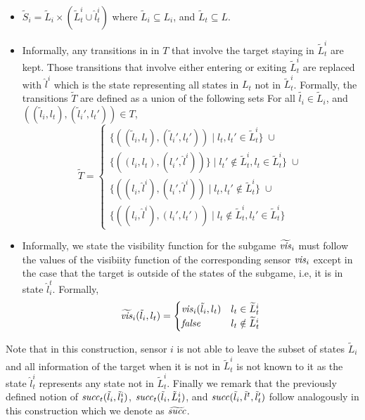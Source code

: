 \begin{itemize}
\item $\widetilde{S}_i= \widetilde{L}_i \times (\widetilde{L}^i_t \cup \hat{l}^i_t)$ where $\widetilde{L}_i\subseteq L_i$, and $\widetilde{L}_t \subseteq L$. 
\item Informally, any transitions in in $T$ that involve the target staying in $\widetilde{L}^i_t$ are kept. Those transitions that involve either entering or exiting $\widetilde{L}^i_t$ are replaced with $\hat{l}^i$ which is the state representing all states in $L_t$ not in $\widetilde{L}^i_t$. Formally, the transitions $\widetilde{T}$ are defined as a union of the following sets  For all $\tilde{l_i} \in \widetilde{L}_i$, and $((\tilde{l}_i,l_t),(\tilde{l}_i',l_t')) \in T$, \[\widetilde{T} = \begin{cases}
 \{((\tilde{l}_i,l_t),(\tilde{l}_i',l_t')) \mid l_t,l_t' \in \widetilde{L}^i_t \} \; \cup \\
 \{((l_i,l_t),(l_i',\hat{l}^i)) \} \mid l_t' \notin \widetilde{L}_t^i, l_t \in \widetilde{L}_t^i \}  \; \cup \\
 \{((l_i,\hat{l}^i),(l_i',\hat{l}^i)) \mid l_t,l_t' \notin \widetilde{L}_t^i \}  \; \cup \\
 \{((l_i,\hat{l}^i),(l_i',l_t')) \mid l_t \notin \widetilde{L}_t^i, l_t' \in \widetilde{L}_t^i \} 
  \end{cases}   \]
  
\item Informally, we state the visibility function for the subgame $\widetilde{\mathit{vis}}_i$ must follow the values of the visibiity function of the corresponding sensor $\mathit{vis}_i$ except in the case that the target is outside of the states of the subgame, i.e, it is in state $\hat{l}^t_i$. Formally,  \[\widetilde{\mathit{vis}}_i(\tilde{l}_i,l_t) = \begin{cases}
\mathit{vis}_i(\tilde{l}_i,l_t) & l_t \in \widetilde{L}_t^i \\
\mathit{false} & l_t \notin \widetilde{L}_t^i
\end{cases}
\]
\end{itemize}
Note that in this construction, sensor $i$ is not able to leave the subset of states $\tilde{L}_i$ and all information of the target when it is not in $\tilde{L}_t^i$ is not known to it as the state $\hat{l}_t^i$ represents any state not in $\tilde{L}_t^i$. Finally we remark that the previously defined notion of $\mathit{succ}_t(\tilde{l}_i,\tilde{l}^i_{t})$, $\mathit{succ}_t(\tilde{l}_i,\tilde{L}^i_{t})$, and $\mathit{succ}(\tilde{l}_i,\tilde{l}^{t},\tilde{l}_{t}')$ follow analogously in this construction which we denote as $\widetilde{\mathit{succ}}$.

